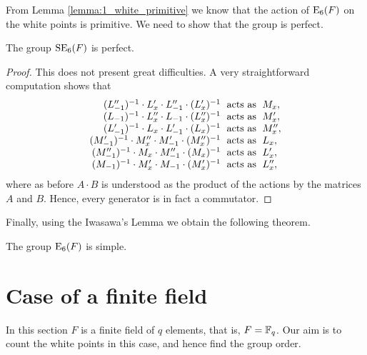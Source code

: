From Lemma \ref{lemma:1_white_primitive} we know that the action of $\mathord{\mathrm{E}}_6(F)$ 
on the white points is primitive. We need to show that the group is perfect.

\begin{lemma}
	The group $\mathrm{SE}_6(F)$ is perfect.
\end{lemma}

\begin{proof}
	This does not present great difficulties. A very straightforward computation 
	shows that 
	\begin{equation*}
	\begin{array}{r@{\;}c@{\;}l}
		(L_{-1}'')^{-1} \cdot L_x' \cdot L_{-1}'' \cdot (L_x')^{-1} & 
								\text{ acts as } & M_x, \\
		(L_{-1})^{-1} \cdot L_x'' \cdot L_{-1} \cdot (L_x'')^{-1} & 
								\text{ acts as } & M_x', \\
		(L_{-1}')^{-1} \cdot L_x \cdot L_{-1}' \cdot (L_x)^{-1} & 
								\text{ acts as } & M_x'', \\
								
		(M_{-1}')^{-1} \cdot M_x'' \cdot M_{-1}' \cdot (M_x'')^{-1} & 
								\text{ acts as } & L_x, \\
		(M_{-1}'')^{-1} \cdot M_x \cdot M_{-1}'' \cdot (M_x)^{-1} & 
								\text{ acts as } & L_x', \\
		(M_{-1})^{-1} \cdot M_x' \cdot M_{-1} \cdot (M_x')^{-1} & 
								\text{ acts as } & L_x'', \\
	\end{array}
	\end{equation*}
	where as before $A \cdot B$ is understood as the product of the actions 
	by the matrices $A$ and $B$. Hence, every generator is in fact a commutator.
\end{proof}

Finally, using the Iwasawa's Lemma we obtain the following theorem.

\begin{theorem}
	The group $\mathord{\mathrm{E}}_6(F)$ is simple. 
\end{theorem}

\section{Case of a finite field}

In this section $F$ is a finite field of $q$ elements, that is, $F = \mathbb{F}_q$. 
Our aim is to count the white points in this case, and hence find the group order. 

